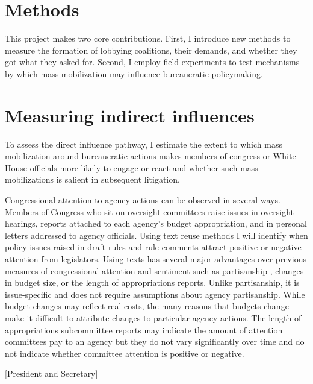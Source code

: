 

\section{Methods}
This project makes two core contributions. First, I introduce new methods to 
measure the formation of lobbying coalitions, their demands, and whether they got what they asked for. 
Second, I employ field experiments to test mechanisms by which mass mobilization may influence bureaucratic policymaking. 

\section{Measuring indirect influences}
To assess the direct influence pathway, I estimate the extent to which mass mobilization around bureaucratic actions makes members of congress or White House officials more likely to engage or react and whether such mass mobilizations is salient in subsequent litigation. 

Congressional attention to agency actions can be observed in several ways. Members of Congress who sit on oversight committees raise issues in oversight hearings, reports attached to each agency's budget appropriation, and in personal letters addressed to agency officials. Using text reuse methods I will identify when policy issues raised in draft rules and rule comments attract positive or negative attention from legislators. Using texts has several major advantages over previous measures of congressional attention and sentiment such as partisanship \citep{Yaver2016,Lewis2008}, changes in budget size, or the length of appropriations reports. Unlike partisanship, it is issue-specific and does not require assumptions about agency partisanship. While budget changes may reflect real costs, the many reasons that budgets change make it difficult to attribute changes to particular agency actions. The length of appropriations subcommittee reports may indicate the amount of attention committees pay to an agency but they do not vary significantly over time and do not indicate whether committee attention is positive or negative. 

[President and Secretary]

